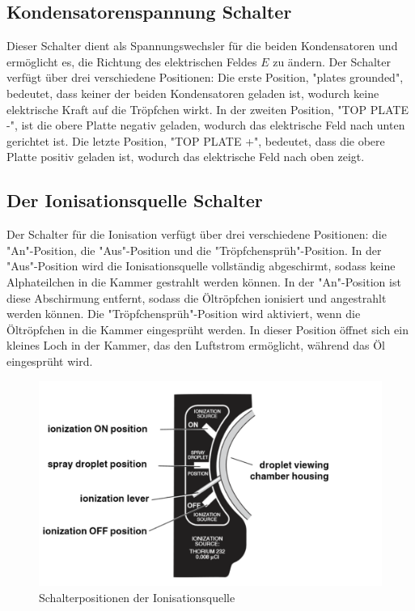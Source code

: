 \subsection{Kondensatorenspannung Schalter}\label{sub:Spannungsschalter}
Dieser Schalter dient als Spannungswechsler für die beiden Kondensatoren und ermöglicht es, die Richtung des elektrischen Feldes $E$ zu ändern. Der Schalter verfügt über drei verschiedene Positionen: Die erste Position, "plates grounded", bedeutet, dass keiner der beiden Kondensatoren geladen ist, wodurch keine elektrische Kraft auf die Tröpfchen wirkt. In der zweiten Position, "TOP PLATE -", ist die obere Platte negativ geladen, wodurch das elektrische Feld nach unten gerichtet ist. Die letzte Position, "TOP PLATE +", bedeutet, dass die obere Platte positiv geladen ist, wodurch das elektrische Feld nach oben zeigt.

\subsection{Der Ionisationsquelle Schalter}\label{sub:ionisationquelle}
Der Schalter für die Ionisation verfügt über drei verschiedene Positionen: die "An"-Position, die "Aus"-Position und die "Tröpfchensprüh"-Position. In der "Aus"-Position wird die Ionisationsquelle vollständig abgeschirmt, sodass keine Alphateilchen in die Kammer gestrahlt werden können. In der "An"-Position ist diese Abschirmung entfernt, sodass die Öltröpfchen ionisiert und angestrahlt werden können. Die "Tröpfchensprüh"-Position wird aktiviert, wenn die Öltröpfchen in die Kammer eingesprüht werden. In dieser Position öffnet sich ein kleines Loch in der Kammer, das den Luftstrom ermöglicht, während das Öl eingesprüht wird.

\begin{figure}[ht]
	\begin{center}
		\includegraphics[scale=0.5]{bilder/pdf/Schalterfunktionen.pdf}
		\caption{Schalterpositionen der Ionisationsquelle}
		\label{fig:Schalterpositionen}
	\end{center}
\end{figure}

